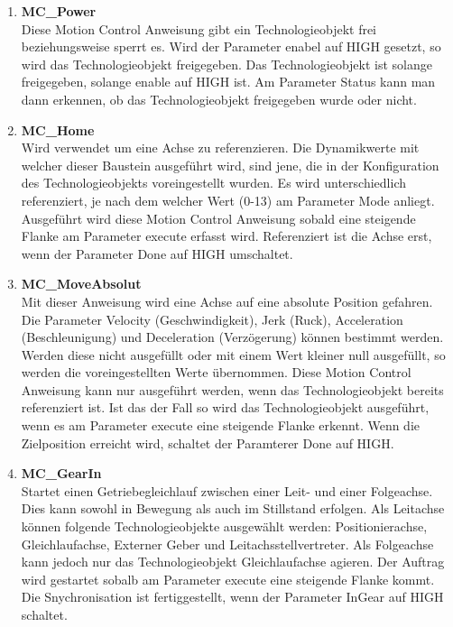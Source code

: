 \begin{enumerate}
    \item \textbf{MC\_Power} \\
        Diese Motion Control Anweisung gibt ein Technologieobjekt frei beziehungsweise sperrt es. Wird der Parameter enabel auf HIGH gesetzt, so wird das Technologieobjekt freigegeben. Das Technologieobjekt ist solange freigegeben, solange enable auf HIGH ist. Am Parameter Status kann man dann erkennen, ob das Technologieobjekt freigegeben wurde oder nicht.

    \item \textbf{MC\_Home} \\
        Wird verwendet um eine Achse zu referenzieren. Die Dynamikwerte mit welcher dieser Baustein ausgeführt wird, sind jene, die in der Konfiguration des Technologieobjekts voreingestellt wurden. Es wird unterschiedlich referenziert, je nach dem welcher Wert (0-13) am Parameter Mode anliegt. Ausgeführt wird diese Motion Control Anweisung sobald eine steigende Flanke am Parameter execute erfasst wird. Referenziert ist die Achse erst, wenn der Parameter Done auf HIGH umschaltet. 

    \item \textbf{MC\_MoveAbsolut} \\
        Mit dieser Anweisung wird eine Achse auf eine absolute Position gefahren. Die Parameter Velocity (Geschwindigkeit), Jerk (Ruck), Acceleration (Beschleunigung) und Deceleration (Verzögerung) können bestimmt werden. Werden diese nicht ausgefüllt oder mit einem Wert kleiner null ausgefüllt, so werden die voreingestellten Werte übernommen. Diese Motion Control Anweisung kann nur ausgeführt werden, wenn das Technologieobjekt bereits referenziert ist. Ist das der Fall so wird das Technologieobjekt ausgeführt, wenn es am Parameter execute eine steigende Flanke erkennt. Wenn die Zielposition erreicht wird, schaltet der Paramterer Done auf HIGH. 

    \item \textbf{MC\_GearIn} \\
        Startet einen Getriebegleichlauf zwischen einer Leit- und einer Folgeachse. Dies kann sowohl in Bewegung als auch im Stillstand erfolgen. Als Leitachse können folgende Technologieobjekte ausgewählt werden: Positionierachse, Gleichlaufachse, Externer Geber und Leitachsstellvertreter. Als Folgeachse kann jedoch nur das Technologieobjekt Gleichlaufachse agieren. Der Auftrag wird gestartet sobalb am Parameter execute eine steigende Flanke kommt. Die Snychronisation ist fertiggestellt, wenn der Parameter InGear auf HIGH schaltet.

\end{enumerate}

